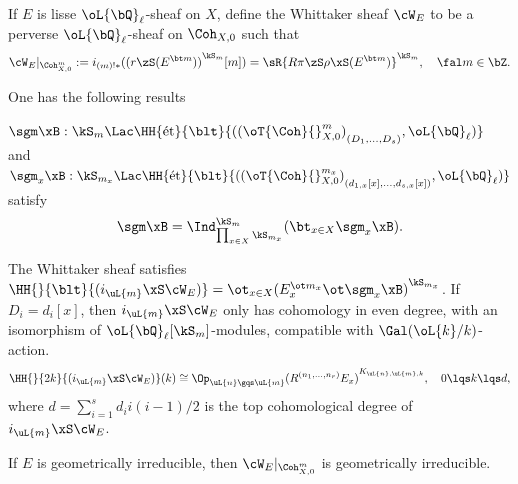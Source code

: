 \documentclass[a4paper, twoside]{article}
\begin{document}
\begin{thm}
	If $E$ is lisse $\oL{\bQ}_{\ell}$-sheaf on $X$, define the Whittaker sheaf $\cW_{E}$ to be a perverse $\oL{\bQ}_{\ell}$-sheaf on $\Coh_{X,0}$ such that
	\[
		\cW_{E}|_{\Coh_{X,0}^{m}}:=i_{(m)!*}({(r\zS(E^{\bt m}))}^{\kS_{m}}[m])=\sR{R\pi\zS\rho\xS(E^{\bt m})}^{\kS_{m}},\quad \fal m\in\bZ.
	\]

	One has the following results
	\begin{enr}[label=(\arabic*)]
		\item $\sgm\xB:\kS_{m}\Lac\HH{\text{{\'e}t}}{\blt}{({(\oT{\Coh}{}_{X,0}^{m})}_{(D_{1},\ldots,D_{s})},\oL{\bQ}_{\ell})}$ and $\sgm_{x}\xB:\kS_{m_{x}}\Lac\HH{\text{{\'e}t}}{\blt}{({(\oT{\Coh}{}_{X,0}^{m_{x}})}_{(d_{1,x}[x],\ldots,d_{s,x}[x])},\oL{\bQ}_{\ell})}$ satisfy
		\[
			\sgm\xB=\Ind_{\prod_{x\in X}\kS_{m_{x}}}^{\kS_{m}}(\bt_{x\in X}\sgm_{x}\xB).
		\]
		\item The Whittaker sheaf satisfies $\HH{}{\blt}{(i_{\uL{m}}\xS\cW_{E})}=\ot_{x\in X}{(E_{x}^{\ot m_{x}}\ot\sgm_{x}\xB)}^{\kS_{m_{x}}}$. If $D_{i}=d_{i}[x]$, then $i_{\uL{m}}\xS\cW_{E}$ only has cohomology in even degree, with an isomorphism of $\oL{\bQ}_{\ell}[\kS_{m}]$-modules, compatible with $\Gal(\oL{k}/k)$-action.
		\[
			\HH{}{2k}{(i_{\uL{m}}\xS\cW_{E})}(k)\cong\Op_{\uL{n}\gqs\uL{m}}{(R^{(n_{1},\ldots,n_{r})}E_{x})}^{K_{\uL{n},\uL{m},k}},\quad 0\lqs k\lqs d,
		\]
		where $d=\sum_{i=1}^{s}d_{i}i(i-1)/2$ is the top cohomological degree of $i_{\uL{m}}\xS\cW_{E}$.
		\item If $E$ is geometrically irreducible, then $\cW_{E}|_{\Coh_{X,0}^{m}}$ is geometrically irreducible.
	\end{enr}
\end{thm}

\end{document}
